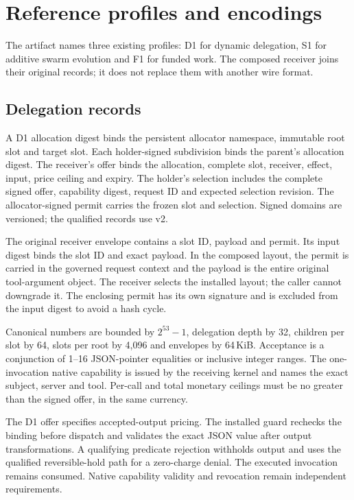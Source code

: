 \section{Reference profiles and encodings}
\label{app:profiles}
The artifact names three existing profiles: D1 for dynamic delegation, S1 for
additive swarm evolution and F1 for funded work. The composed receiver joins
their original records; it does not replace them with another wire format.

\subsection{Delegation records}
A D1 allocation digest binds the persistent allocator namespace, immutable root
slot and target slot. Each holder-signed subdivision binds the parent's
allocation digest. The receiver's offer binds the allocation, complete slot,
receiver, effect, input, price ceiling and expiry. The holder's selection
includes the complete signed offer, capability digest, request ID and expected
selection revision. The allocator-signed permit carries the frozen slot and
selection. Signed domains are versioned; the qualified records use v2.

The original receiver envelope contains a slot ID, payload and permit.
Its input digest binds the slot ID and exact payload. In the composed layout,
the permit is carried in the governed request context and the payload is the
entire original tool-argument object. The receiver selects the installed layout;
the caller cannot downgrade it. The enclosing permit has its own signature and
is excluded from the input digest to avoid a hash cycle.

Canonical numbers are bounded by $2^{53}-1$, delegation depth by 32, children per
slot by 64, slots per root by 4,096 and envelopes by 64\,KiB. Acceptance is a
conjunction of 1--16 JSON-pointer equalities or inclusive integer ranges.
The one-invocation native capability is issued by the receiving kernel and
names the exact subject, server and tool. Per-call and total monetary ceilings
must be no greater than the signed offer, in the same currency.

The D1 offer specifies accepted-output pricing. The installed guard rechecks
the binding before dispatch and validates the exact JSON value after output
transformations. A qualifying predicate rejection withholds output and uses
the qualified reversible-hold path for a zero-charge denial. The executed
invocation remains consumed. Native capability validity and revocation remain
independent requirements.

